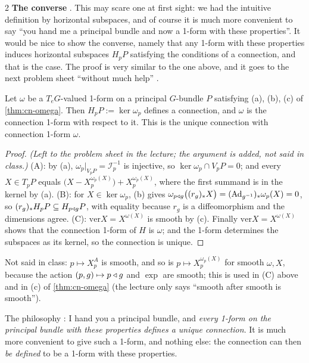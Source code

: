 \begin{paracol}{2}
\textbf{The converse} . This may scare one at first sight: we had the intuitive definition by horizontal subspaces, and of course it is much more convenient to say ``you hand me a principal bundle and now a 1-form with these properties''. It would be nice to show the converse, namely that any 1-form with these properties induces horizontal subspaces $H_pP$ satisfying the conditions of a connection, and that is the case. The proof is very similar to the one above, and it goes to the next problem sheet ``without much help''   .
\begin{theorem}\label{thm:cn-converse}
Let $\omega$ be a $T_eG$-valued 1-form on a principal $G$-bundle $P$ satisfying (a), (b), (c) of \cref{thm:cn-omega}. Then $H_pP:=\ker\omega_p$ defines a connection, and $\omega$ is the connection 1-form with respect to it. This is the unique connection with connection 1-form $\omega$.  
\end{theorem}
\begin{proof}
\emph{(Left to the problem sheet in the lecture; the argument is added, not said in class.)} (A): by (a), $\omega_p|_{V_pP}=\mathcal I_p^{-1}$ is injective, so $\ker\omega_p\cap V_pP=0$; and every $X\in T_pP$ equals $\bigl(X-X^{\omega_p(X)}_p\bigr)+X^{\omega_p(X)}_p$, where the first summand is in the kernel by (a). (B): for $X\in\ker\omega_p$, (b) gives $\omega_{p\mathbin{\triangleleft} g}\bigl((r_g)_*X\bigr)=(\mathrm{Ad}_{g^{-1}})_*\omega_p(X)=0$, so $(r_g)_*H_pP\subseteq H_{p\mathbin{\triangleleft} g}P$, with equality because $r_g$ is a diffeomorphism and the dimensions agree. (C): $\mathrm{ver}X=X^{\omega(X)}$ is smooth by (c). Finally $\mathrm{ver}X=X^{\omega(X)}$ shows that the connection 1-form of $H$ is $\omega$; and the 1-form determines the subspaces as its kernel, so the connection is unique.
\end{proof}
\begin{coursenote}[Smoothness of $X^A$]
Not said in class: $p\mapsto X^{A}_p$ is smooth, and so is $p\mapsto X^{\omega_p(X)}_p$ for smooth $\omega,X$, because the action $(p,g)\mapsto p\mathbin{\triangleleft} g$ and $\exp$ are smooth; this is used in (C) above and in (c) of \cref{thm:cn-omega} (the lecture only says ``smooth after smooth is smooth'').
\end{coursenote}
The philosophy : I hand you a principal bundle, and \emph{every 1-form on the principal bundle with these properties defines a unique connection}. It is much more convenient to give such a 1-form, and nothing else: the connection can then \emph{be defined} to be a 1-form with these properties.


\end{paracol}
